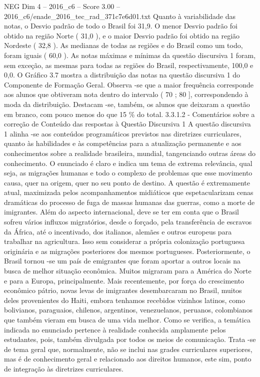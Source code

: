 \begin{textsample}{NEG Dim 4 – 2016\_c6 – Score 3.00 – 2016\_c6/enade\_2016\_tec\_rad\_371c7e6d01.txt}
Quanto à variabilidade das notas, o Desvio padrão de todo o Brasil foi 31,9.
O menor Desvio padrão foi obtido na região Norte ( 31,0 ), e o maior Desvio padrão foi obtido na região Nordeste ( 32,8 ).
As medianas de todas as regiões e do Brasil como um todo, foram iguais ( 60,0 ).
As notas máximas e mínimas da questão discursiva 1 foram, sem exceção, as mesmas para todas as regiões do Brasil, respectivamente, 100,0 e 0,0.
O Gráfico 3.7 mostra a distribuição das notas na questão discursiva 1 do Componente de Formação Geral.
Observa -se que a maior frequência corresponde aos alunos que obtiveram nota dentro do intervalo ( 70 ; 80 ], correspondendo à moda da distribuição.
Destacam -se, também, os alunos que deixaram a questão em branco, com pouco menos do que 15 \% do total. 3.3.1.2 - Comentários sobre a correção de Conteúdo das respostas à Questão Discursiva 1 A questão discursiva 1 alinha -se aos conteúdos programáticos previstos nas diretrizes curriculares, quanto às habilidades e às competências para a atualização permanente e aos conhecimentos sobre a realidade brasileira, mundial, tangenciando outras áreas do conhecimento.
O enunciado é claro e indica um tema de extrema relevância, qual seja, as migrações humanas e todo o complexo de problemas que esse movimento causa, quer na origem, quer no seu ponto de destino.
A questão é extremamente atual, maximizada pelos acompanhamentos midiáticos que espetacularizam cenas dramáticas do processo de fuga de massas humanas das guerras, como a morte de imigrantes.
Além do aspecto internacional, deve se ter em conta que o Brasil sofreu vários influxos migratórios, desde o forçado, pela transferência de escravos da África, até o incentivado, dos italianos, alemães e outros europeus para trabalhar na agricultura.
Isso sem considerar a própria colonização portuguesa originária e as migrações posteriores dos mesmos portugueses.
Posteriormente, o Brasil tornou -se um país de emigrantes que foram aportar a outros locais na busca de melhor situação econômica.
Muitos migraram para a América do Norte e para a Europa, principalmente.
Mais recentemente, por força do crescimento econômico pátrio, novas levas de imigrantes desembarcaram no Brasil, muitos deles provenientes do Haiti, embora tenhamos recebidos vizinhos latinos, como bolivianos, paraguaios, chilenos, argentinos, venezuelanos, peruanos, colombianos que também vieram em busca de uma vida melhor.
Como se verifica, a temática indicada no enunciado pertence à realidade conhecida amplamente pelos estudantes, pois, também divulgada por todos os meios de comunicação.
Trata -se de tema geral que, normalmente, não se inclui nas grades curriculares superiores, mas é de conhecimento geral e relacionado aos direitos humanos, este sim, ponto de integração às diretrizes curriculares.

\end{textsample}
